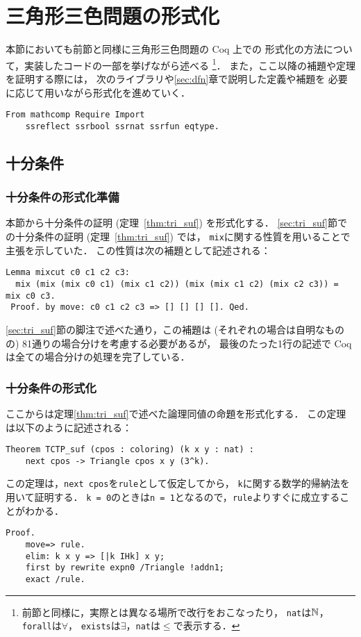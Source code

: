 \section{三角形三色問題の形式化}
本節においても前節と同様に三角形三色問題の Coq 上での
形式化の方法について，実装したコードの一部を挙げながら述べる
\footnote
    {
      前節と同様に，実際とは異なる場所で改行をおこなったり，
      {\tt{nat}}は$\mathbb{N}$，{\tt{forall}}は$\forall$，
      {\tt{exists}}は$\exists$，{\tt{nat}}は$\leq$で表示する．
    }．
また，ここ以降の補題や定理を証明する際には，
次のライブラリや\ref{sec:dfn}章で説明した定義や補題を
必要に応じて用いながら形式化を進めていく．
\begin{lstlisting}[language=Coq]
  From mathcomp Require Import
    ssreflect ssrbool ssrnat ssrfun eqtype.
\end{lstlisting}
  
\subsection{十分条件}
\subsubsection{十分条件の形式化準備}
本節から十分条件の証明 (定理~\ref{thm:tri_suf}) を形式化する．
\ref{sec:tri_suf}節での十分条件の証明 (定理~\ref{thm:tri_suf}) では，
{\tt mix}に関する性質を用いることで主張を示していた．
この性質は次の補題として記述される：
\begin{lstlisting}[language=Coq]
 Lemma mixcut c0 c1 c2 c3:
  mix (mix (mix c0 c1) (mix c1 c2)) (mix (mix c1 c2) (mix c2 c3)) = mix c0 c3.
 Proof. by move: c0 c1 c2 c3 => [] [] [] []. Qed.
\end{lstlisting}
\ref{sec:tri_suf}節の脚注で述べた通り，この補題は (それぞれの場合は自明なものの) 81通りの場合分けを考慮する必要があるが，
最後のたった1行の記述で Coq は全ての場合分けの処理を完了している．

\subsubsection{十分条件の形式化}
ここからは定理\ref{thm:tri_suf}で述べた論理同値の命題を形式化する．
この定理は以下のように記述される：
\begin{lstlisting}[language=Coq]
  Theorem TCTP_suf (cpos : coloring) (k x y : nat) :
    next cpos -> Triangle cpos x y (3^k).
\end{lstlisting}
この定理は，{\tt{next cpos}}を{\tt{rule}}として仮定してから，
{\tt{k}}に関する数学的帰納法を用いて証明する．
{\tt{k = 0}}のときは{\tt{n = 1}}となるので，{\tt{rule}}よりすぐに成立することがわかる．
\begin{lstlisting}[language=Coq]
  Proof.
    move=> rule.
    elim: k x y => [|k IHk] x y;
    first by rewrite expn0 /Triangle !addn1;
    exact /rule.
\end{lstlisting}

